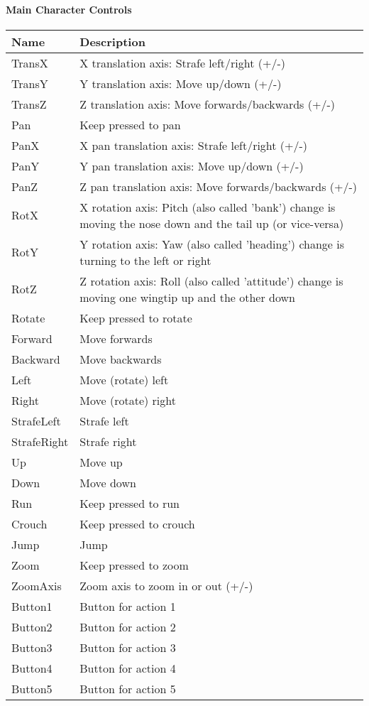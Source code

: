 \paragraph{Main Character Controls}
\begin{center}
	\centering
	\begin{longtable}{ | l | p{10cm} |}
	\hline
	Name	& Description \\ \hline
	TransX		&	X translation axis: Strafe left/right (+/-)\\
	TransY		&	Y translation axis: Move up/down (+/-)\\
	TransZ		&	Z translation axis: Move forwards/backwards (+/-)\\
	Pan			&	Keep pressed to pan\\
	PanX		&	X pan translation axis: Strafe left/right (+/-)\\
	PanY		&	Y pan translation axis: Move up/down (+/-)\\
	PanZ		&	Z pan translation axis: Move forwards/backwards (+/-)\\
	RotX		&	X rotation axis: Pitch (also called 'bank') change is moving the nose down and the tail up (or vice-versa)\\
	RotY		&	Y rotation axis: Yaw (also called 'heading') change is turning to the left or right\\
	RotZ		&	Z rotation axis: Roll (also called 'attitude') change is moving one wingtip up and the other down\\
	Rotate		&	Keep pressed to rotate\\
	Forward		&	Move forwards\\
	Backward	&	Move backwards\\
	Left		&	Move (rotate) left\\
	Right		&	Move (rotate) right\\
	StrafeLeft	&	Strafe left\\
	StrafeRight	&	Strafe right\\
	Up			&	Move up\\
	Down		&	Move down\\
	Run			&	Keep pressed to run\\
	Crouch		&	Keep pressed to crouch\\
	Jump		&	Jump\\
	Zoom		&	Keep pressed to zoom\\
	ZoomAxis	&	Zoom axis to zoom in or out (+/-)\\
	Button1		&	Button for action 1\\
	Button2		&	Button for action 2\\
	Button3		&	Button for action 3\\
	Button4		&	Button for action 4\\
	Button5		&	Button for action 5\\
	\hline
	\end{longtable}
\end{center}



